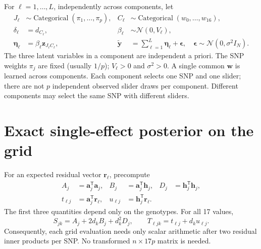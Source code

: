 \documentclass[11pt]{article}
\newcommand{\Normal}{\mathcal N}
\newcommand{\T}{^{\mathsf T}}
\newcommand{\yb}{\widetilde{\mathbf y}}
\begin{document}
For $\ell=1,\ldots,L$, independently across components, let
\begin{align}
 J_\ell&\sim\operatorname{Categorical}(\pi_1,\ldots,\pi_p),&
 C_\ell&\sim\operatorname{Categorical}(w_0,\ldots,w_{16}),\nonumber\\
 \delta_\ell&=d_{C_\ell},&\beta_\ell&\sim\Normal(0,V_\ell),\nonumber\\
 \boldsymbol\eta_\ell&=\beta_\ell\mathbf z_{J_\ell C_\ell},&
 \yb&=\sum_{\ell=1}^L\boldsymbol\eta_\ell+
       \boldsymbol\epsilon,\quad
       \boldsymbol\epsilon\sim\Normal(0,\sigma^2 I_N).
 \label{eq:model}
\end{align}
The three latent variables in a component are independent a priori.
The SNP weights $\pi_j$ are fixed (usually $1/p$); $V_\ell>0$ and
$\sigma^2>0$. A single common $\mathbf w$ is learned across components.
Each component selects one SNP and one slider; there are not $p$
independent observed slider draws per component. Different components may
select the same SNP with different sliders.

\newpage
\section{Exact single-effect posterior on the grid}
For an expected residual vector $\mathbf r_\ell$, precompute
\begin{align}
 A_j&=\mathbf a_j\T\mathbf a_j,&
 B_j&=\mathbf a_j\T\mathbf h_j,&
 D_j&=\mathbf h_j\T\mathbf h_j,\nonumber\\
 t_{\ell j}&=\mathbf a_j\T\mathbf r_\ell,&
 u_{\ell j}&=\mathbf h_j\T\mathbf r_\ell.
 \label{eq:stats}
\end{align}
The first three quantities depend only on the genotypes. For all 17 values,
\begin{equation}
 S_{jk}=A_j+2d_kB_j+d_k^2D_j,\qquad
 T_{\ell jk}=t_{\ell j}+d_ku_{\ell j}.
 \label{eq:ST}
\end{equation}
Consequently, each grid evaluation needs only scalar arithmetic after two
residual inner products per SNP. No transformed $n\times17p$ matrix is needed.
\end{document}
